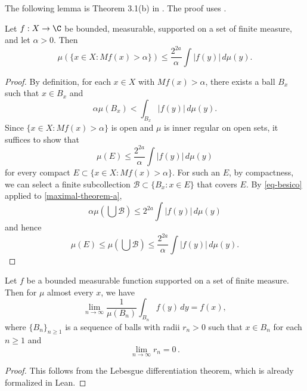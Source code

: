 The following lemma is Theorem 3.1(b) in \cite{stein-book}. The proof uses .
\begin{lemma} 
    \label{maximal-theorem}
    Let $f: X \to \C$ be bounded, measurable, supported on a set of finite measure, and let $\alpha > 0$. Then
    \begin{equation}
        \label{maximal-theorem-equation}
        \mu(\{x\in X : Mf(x) > \alpha\}) \le \frac{2^{2a}}{\alpha} \int |f(y)|\, d\mu(y).
    \end{equation}
\end{lemma}
\begin{proof}
    By definition, for each $x\in X$ with $Mf(x) > \alpha$, there exists a ball $B_x$ such that $x\in B_x$ and
    \begin{equation}
        \label{maximal-theorem-a}
        \alpha \mu(B_x) < \int_{B_x} |f(y)|\, d\mu(y).
    \end{equation}
    Since $\{x\in X : Mf(x) > \alpha\}$ is open and $\mu$ is inner regular on open sets, it suffices to show that
    \begin{equation*}
        \mu(E) \le \frac{2^{2a}}{\alpha} \int |f(y)|\, d\mu(y)
    \end{equation*}
    for every compact $E\subset \{x\in X : Mf(x) > \alpha\}$.
    For such an $E$, by compactness, we can select a finite subcollection $\mathcal{B} \subset \{B_x: x\in E\}$ that covers $E$.
    By \eqref{eq-besico} applied to \eqref{maximal-theorem-a},
    \begin{equation}
        \alpha \mu(\bigcup \mathcal{B}) \le 2^{2a} \int |f(y)|\,d\mu(y)
    \end{equation}
    and hence
    \begin{equation*}
        \mu(E) \le \mu(\bigcup \mathcal{B}) \le \frac{2^{2a}}{\alpha} \int |f(y)|\,d\mu(y).
    \end{equation*}
\end{proof}

\begin{lemma}
    \label{Lebesgue-differentiation}
    Let $f$ be a bounded measurable function supported on a set of finite measure. Then for $\mu$ almost every $x$, we have
    $$\lim_{n\to \infty} \frac{1}{\mu(B_n)}\int_{B_n} f(y)\, dy= f(x),$$
    where $\{B_n\}_{n\geq 1}$ is a sequence of balls with radii $r_n>0$ such that $x\in B_n$ for each $n\geq 1$ and
    \begin{equation*}
        \lim_{n\to \infty} r_n=0 \,.
    \end{equation*}
\end{lemma}
\begin{proof}
    This follows from the Lebesgue differentiation theorem, which is already formalized in Lean.
\end{proof}

